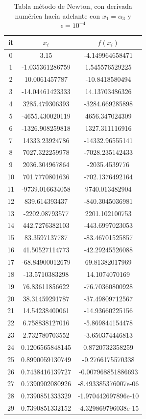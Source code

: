 \documentclass{article} %
\begin{document}
\begin{table}[H]
\centering
\begin{tabular}{|c|c|c|}
\hline
it & $x_i$ & $f(x_i)$\\
\hline
0 & 3.15 & -4.149964658471\\
1 & -1.035361286759 & 1.545576529225\\
2 & 10.0061457787 & -10.8418580494\\
3 & -14.04461423333 & 14.13703486326\\
4 & 3285.479306393 & -3284.669285898\\
5 & -4655.430020119 & 4656.347024309\\
6 & -1326.908259818 & 1327.311116916\\
7 & 14333.23924786 & -14332.96555141\\
8 & 7027.322259978 & -7028.235142433\\
9 & 2036.304967864 & -2035.4539776\\
10 & 701.7770801636 & -702.1376492164\\
11 & -9739.016634058 & 9740.013482904\\
12 & 839.614393437 & -840.3045036981\\
13 & -2202.08793577 & 2201.102100753\\
14 & 442.7276382103 & -443.6997023053\\
15 & 83.3597137787 & -83.46701525857\\
16 & 41.50527114773 & -42.29245526088\\
17 & -68.84900012679 & 69.81382017969\\
18 & -13.5710383298 & 14.1074070169\\
19 & 76.83611856622 & -76.70360800928\\
20 & 38.31459291787 & -37.49809712567\\
21 & 14.54238400061 & -14.93660225156\\
22 & 6.758838127016 & -5.869844154478\\
23 & 2.732780703552 & -3.650374446813\\
24 & 0.1206565848145 & 0.8720732358259\\
25 & 0.8990059130749 & -0.2766175570338\\
26 & 0.7438416139727 & -0.007968851886693\\
27 & 0.7390902080926 & -8.493385376007e-06\\
28 & 0.7390851333329 & -1.970442697896e-10\\
29 & 0.7390851332152 & -4.329869796038e-15\\
\hline
\end{tabular}
\caption{Tabla método de Newton, con derivada numérica hacia adelante con $x_1 = \alpha_3$ y $\epsilon = 10^{-4}$}
\end{table}
\end{document}
